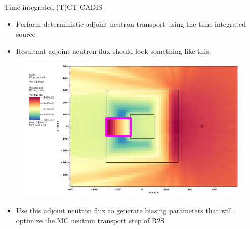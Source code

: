 \documentclass{beamer}
\begin{document}
\begin{frame}{Time-integrated (T)GT-CADIS}
	\begin{itemize}
		\item{Perform deterministic adjoint neutron transport using the
			time-integrated source}
		\item{Resultant adjoint neutron flux should look something like
			this:}
	\end{itemize}
        \begin{figure}
	\centering
	\includegraphics[scale=0.20]{tgt_adj_n.jpg}
	\end{figure}
	\begin{itemize}
		\item{Use this adjoint neutron flux to generate biasing
			parameters that will optimize the MC neutron transport
			step of R2S}
	\end{itemize}
\end{frame}
\end{document}
